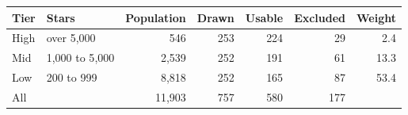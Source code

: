 \begin{tabular}{llrrrrr}
\toprule
Tier & Stars & Population & Drawn & Usable & Excluded & Weight \\
\midrule
High & over 5{,}000 & 546 & 253 & 224 & 29 & 2.4 \\
Mid & 1{,}000 to 5{,}000 & 2{,}539 & 252 & 191 & 61 & 13.3 \\
Low & 200 to 999 & 8{,}818 & 252 & 165 & 87 & 53.4 \\
\midrule
All & & 11{,}903 & 757 & 580 & 177 & \\
\bottomrule
\end{tabular}
